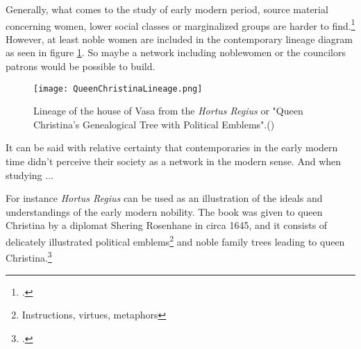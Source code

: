 Generally, what comes to the study of early modern period, source material concerning women, lower social classes or marginalized groups are harder to find.\footcite{TODO} 
However, at least noble women are included in the contemporary lineage diagram as seen in figure \ref{queenlineage}. So maybe a network including noblewomen or the councilors patrons would be possible to build.

\begin{figure}
	\texttt{[image: QueenChristinaLineage.png]}
	\caption{Lineage of the house of Vasa from the \textit{Hortus Regius} or "Queen Christina's Genealogical Tree with Political Emblems".(\cite{hortusregius})} 
	\centering
	\label{queenlineage}
\end{figure}

It can be said with relative certainty that contemporaries in the early modern time didn't perceive their society as a network in the modern sense. And when studying ...

For instance \textit{Hortus Regius} can be used as an illustration of the ideals and understandings of the early modern nobility. The book was given to queen Christina by a diplomat Shering Rosenhane in circa 1645, and it consists of delicately illustrated political emblems\footnote{Instructions, virtues, metaphors} and noble family trees leading to queen Christina.\footcite{congresslibrary} 
